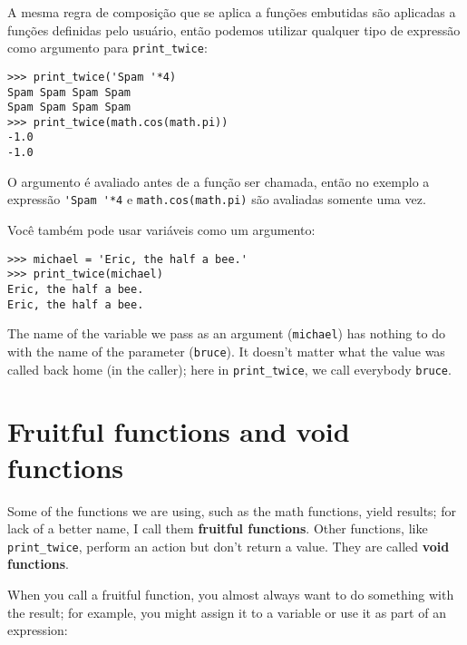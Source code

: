 A mesma regra de composição que se aplica a funções embutidas são
aplicadas a funções definidas pelo usuário, então podemos utilizar
qualquer tipo de expressão como argumento para \verb"print_twice":


\beforeverb
\begin{verbatim}
>>> print_twice('Spam '*4)
Spam Spam Spam Spam
Spam Spam Spam Spam
>>> print_twice(math.cos(math.pi))
-1.0
-1.0
\end{verbatim}
\afterverb
%

%
O argumento é avaliado antes de a função ser chamada, então no exemplo
a expressão \verb"'Spam '*4" e {\tt math.cos(math.pi)} são avaliadas
somente uma vez.



Você também pode usar variáveis como um argumento:

\beforeverb
\begin{verbatim}
>>> michael = 'Eric, the half a bee.'
>>> print_twice(michael)
Eric, the half a bee.
Eric, the half a bee.
\end{verbatim}
\afterverb
%
The name of the variable we pass as an argument ({\tt michael}) has
nothing to do with the name of the parameter ({\tt bruce}).  It
doesn't matter what the value was called back home (in the caller);
here in \verb"print_twice", we call everybody {\tt bruce}.

\section{Fruitful functions and void functions}


Some of the functions we are using, such as the math functions, yield
results; for lack of a better name, I call them {\bf fruitful
  functions}.  Other functions, like \verb"print_twice", perform an
action but don't return a value.  They are called {\bf void
  functions}.

When you call a fruitful function, you almost always
want to do something with the result; for example, you might
assign it to a variable or use it as part of an expression:

